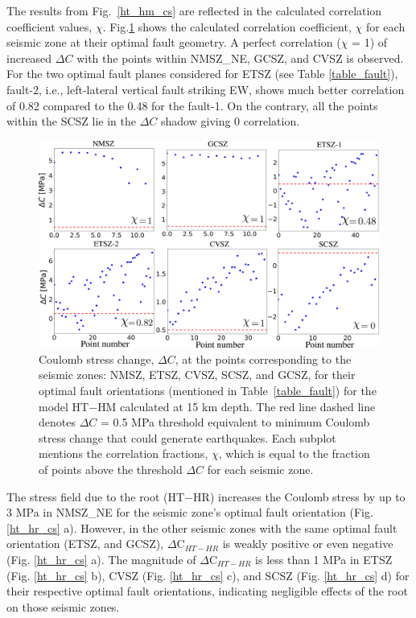 \documentclass[draft,linenumbers]{agujournal2018}
\begin{document}
The results from Fig.~\ref{ht_hm_cs} are reflected in the calculated correlation coefficient values, $\chi$. Fig.\ref{ht_hm_corr} shows the calculated correlation coefficient, $\chi$ for each seismic zone at their optimal fault geometry. A perfect correlation ($\chi$ = 1) of increased $\Delta C$ with the points within NMSZ\_NE, GCSZ, and CVSZ is observed. For the two optimal fault planes considered for ETSZ (see Table  \ref{table_fault}), fault-2, i.e., left-lateral vertical fault striking EW, shows much better correlation of 0.82 compared to the 0.48 for the fault-1. On the contrary, all the points within the SCSZ lie in the $\Delta C$ shadow giving 0 correlation.

\begin{figure}[h!]
    \centering
    \includegraphics[width=0.75\linewidth]{figures/corr_cs_ht_hm.png}
    \caption{Coulomb stress change, $\Delta C$, at the points corresponding to the seismic zones: NMSZ, ETSZ, CVSZ, SCSZ, and GCSZ, for their optimal fault orientations (mentioned in Table~\ref{table_fault}) for the model HT$-$HM calculated at 15 km depth. The red line dashed line denotes $\Delta C$ = 0.5 MPa threshold equivalent to minimum Coulomb stress change that could generate earthquakes. Each subplot mentions the correlation fractions, $\chi$, which is equal to the fraction of points above the threshold $\Delta C$ for each seismic zone.}
    \label{ht_hm_corr}
\end{figure}

The stress field due to the root (HT$-$HR) increases the Coulomb stress by up to 3 MPa in NMSZ\_NE for the seismic zone's optimal fault orientation (Fig. \ref{ht_hr_cs} a). However, in the other seismic zones with the same optimal fault orientation (ETSZ, and GCSZ), $\Delta $C$_{HT-HR}$ is weakly positive or even negative (Fig. \ref{ht_hr_cs} a). The magnitude of $\Delta $C$_{HT-HR}$ is less than 1 MPa in ETSZ (Fig. \ref{ht_hr_cs} b), CVSZ (Fig. \ref{ht_hr_cs} c), and SCSZ (Fig. \ref{ht_hr_cs} d) for their respective optimal fault orientations, indicating negligible effects of the root on those seismic zones. 
\end{document}
